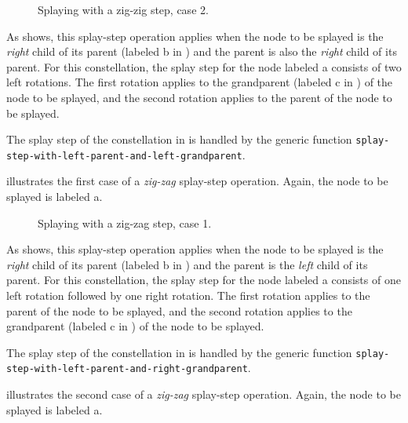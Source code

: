 \begin{figure}
\begin{center}
\end{center}
\caption{\label{fig-splay-zig-zig-2}
Splaying with a zig-zig step, case 2.}
\end{figure}

As  shows, this splay-step operation
applies when the node to be splayed is the \emph{right} child of its
parent (labeled \textsf{b} in ) and the
parent is also the \emph{right} child of its parent.  For this
constellation, the splay step for the node labeled \textsf{a} consists
of two left rotations.  The first rotation applies to the grandparent
(labeled \textsf{c} in ) of the node to be
splayed, and the second rotation applies to the parent of the node to
be splayed.

The splay step of the constellation in  is
handled by the generic function
\texttt{splay-step-with-left-parent-and-left-grandparent}.

 illustrates the first case of a
\emph{zig-zag} splay-step operation.  Again, the node to be splayed is
labeled \textsf{a}.

\begin{figure}
\begin{center}
\end{center}
\caption{\label{fig-splay-zig-zag-1}
Splaying with a zig-zag step, case 1.}
\end{figure}

As  shows, this splay-step operation
applies when the node to be splayed is the \emph{right} child of its
parent (labeled \textsf{b} in ) and the
parent is the \emph{left} child of its parent.  For this
constellation, the splay step for the node labeled \textsf{a} consists
of one left rotation followed by one right rotation.  The first
rotation applies to the parent of the node to be splayed, and the
second rotation applies to the grandparent (labeled \textsf{c} in
) of the node to be splayed.

The splay step of the constellation in  is
handled by the generic function
\texttt{splay-step-with-left-parent-and-right-grandparent}.

 illustrates the second case of a
\emph{zig-zag} splay-step operation.  Again, the node to be splayed is
labeled \textsf{a}.

